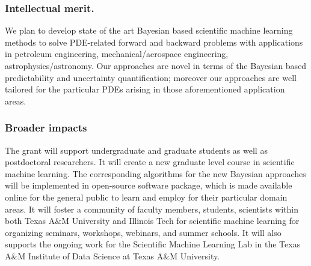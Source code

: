 \documentclass[11pt]{NSFamsart}
\begin{document}
\subsubsection*{Intellectual merit.} 
We plan to develop state of the art Bayesian based scientific machine learning methods to solve PDE-related forward and backward problems with applications in petroleum engineering, mechanical/aerospace engineering, astrophysics/astronomy.  Our approaches are novel in terms of the Bayesian based predictability and uncertainty quantification; moreover our approaches are well tailored for the particular PDEs arising in those aforementioned application areas.

\subsubsection*{Broader impacts} 
The grant will support undergraduate and graduate students as well as postdoctoral researchers.  It will create a new graduate level course in scientific machine learning. The corresponding algorithms for the new Bayesian approaches will be implemented in open-source software package, which is made available online for the general public to learn and employ for their particular domain areas.  It will foster a community of faculty members, students, scientists within both Texas A$\&$M University and Illinois Tech for scientific machine learning for organizing seminars, workshops, webinars, and summer schools.  It will also supports the ongoing work for the Scientific Machine Learning Lab in the Texas A$\&$M Institute of Data Science at Texas A$\&$M University.

 





\newpage
{}
\renewcommand{\thepage} {\arabic{page}}


% 
%

\end{document}
